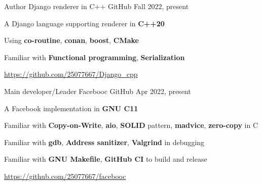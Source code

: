 

\begin{cventries}
    \cventry
    {Author}
    {Django renderer in C++}
    {GitHub} %
    {Fall 2022, present} %
    {
        \begin{cvitems} %
        \item {A Django language supporting renderer in \textbf{C++20}}
        \item {Using \textbf{co-routine}, \textbf{conan}, \textbf{boost}, \textbf{CMake}}
        \item {Familiar with \textbf{Functional programming}, \textbf{Serialization}}
        \item {\url{https://github.com/25077667/Django_cpp}}
        \end{cvitems}
    }

    \cventry
    {Main developer/Leader}
    {Facebooc}
    {GitHub} %
    {Apr 2022, present} %
    {
        \begin{cvitems} %
            \item {A Facebook implementation in \textbf{GNU C11}}
            \item {Familiar with \textbf{Copy-on-Write}, \textbf{aio}, \textbf{SOLID} pattern, \textbf{madvice}, \textbf{zero-copy} in C}
            \item {Familiar with \textbf{gdb}, \textbf{Address sanitizer}, \textbf{Valgrind} in debugging}
            \item {Familiar with \textbf{GNU Makefile}, \textbf{GitHub CI} to build and release}
            \item {\url{https://github.com/25077667/facebooc}}
        \end{cvitems}
    }


\end{cventries}
